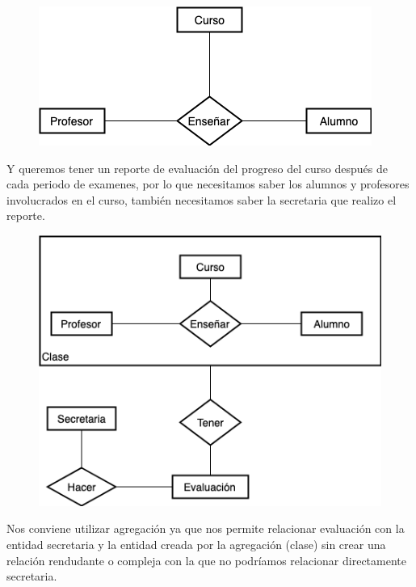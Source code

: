 \documentclass[letterpaper,11pt]{article}
\begin{document}
\begin{itemize}
\begin{itemize}
               \begin{figure}[h]
                \centering
                \includegraphics[scale=0.6]{./imagenes/Ejemplo1.jpg}
                \end{figure}

               Y queremos tener un reporte de evaluación del
               progreso del curso después de cada periodo de examenes, 
               por lo que necesitamos saber los alumnos y profesores 
               involucrados en el curso, también necesitamos saber 
               la secretaria que realizo el reporte. 
               
               \begin{figure}[H]
                \centering
                \includegraphics[scale=0.6]{./imagenes/Ejemplo1a.jpg}
                \end{figure} 

               Nos conviene utilizar agregación ya que nos 
               permite relacionar evaluación con la entidad 
               secretaria y la entidad creada por la agregación (clase)
               sin crear una relación rendudante o compleja con la que
               no podríamos relacionar directamente secretaria.


\end{itemize}
\end{itemize}
\end{document}
